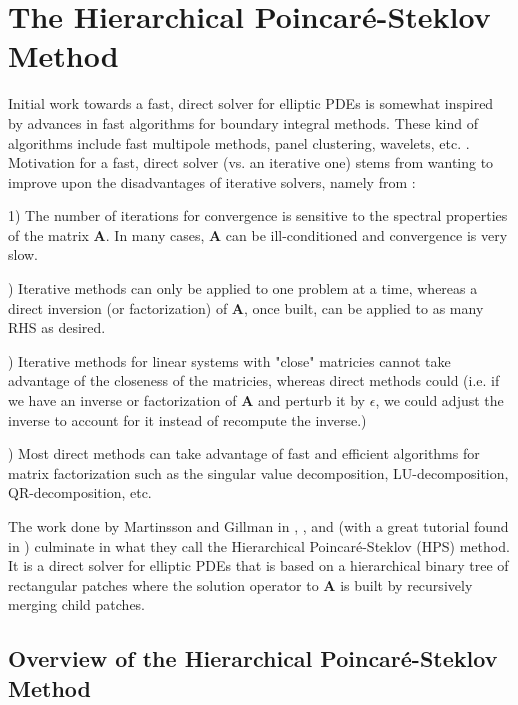 \section{The Hierarchical Poincaré-Steklov Method}

Initial work towards a fast, direct solver for elliptic PDEs is somewhat inspired by advances in fast algorithms for boundary integral methods. These kind of algorithms include fast multipole methods, panel clustering, wavelets, etc. \citep{martinsson2004fast}. Motivation for a fast, direct solver (vs. an iterative one) stems from wanting to improve upon the disadvantages of iterative solvers, namely from \citep{martinsson2004fast}:

\begin{adjustwidth}{0.25cm}{}
    1) The number of iterations for convergence is sensitive to the spectral properties of the matrix $\textbf{A}$. In many cases, $\textbf{A}$ can be ill-conditioned and convergence is very slow.

    ) Iterative methods can only be applied to one problem at a time, whereas a direct inversion (or factorization) of $\textbf{A}$, once built, can be applied to as many RHS as desired.

    ) Iterative methods for linear systems with "close" matricies cannot take advantage of the closeness of the matricies, whereas direct methods could (i.e. if we have an inverse or factorization of $\textbf{A}$ and perturb it by $\epsilon$, we could adjust the inverse to account for it instead of recompute the inverse.)

    ) Most direct methods can take advantage of fast and efficient algorithms for matrix factorization such as the singular value decomposition, LU-decomposition, QR-decomposition, etc.
\end{adjustwidth}

The work done by Martinsson and Gillman in \citep{martinsson2004fast}, \citep{MARTINSSON2013460}, and \citep{gillman2014direct} (with a great tutorial found in \citep{martinsson2015hierarchical}) culminate in what they call the Hierarchical Poincaré-Steklov (HPS) method. It is a direct solver for elliptic PDEs that is based on a hierarchical binary tree of rectangular patches where the solution operator to $\textbf{A}$ is built by recursively merging child patches.

\subsection{Overview of the Hierarchical Poincaré-Steklov Method}

